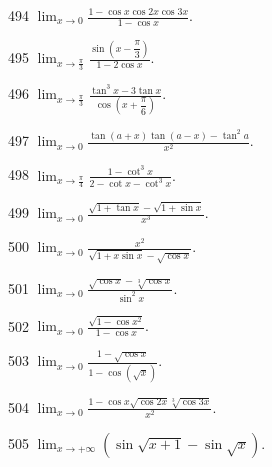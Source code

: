 \begin{prob}[S]{494}
$\displaystyle \lim_{x\to 0} \frac{1 - \cos x \cos 2x \cos 3x}{1 - \cos x}.$
\end{prob}

\begin{prob}[S]{495}
$\displaystyle \lim_{x\to \frac{\pi}{3}} \frac{\sin\left(x - \dfrac{\pi}{3}\right)}{1 - 2\cos x}.$
\end{prob}

\begin{prob}[S]{496}
$\displaystyle \lim_{x\to \frac{\pi}{3}} \frac{\tan^3 x - 3\tan x}{\cos\left(x + \dfrac{\pi}{6}\right)}.$
\end{prob}

\begin{prob}[S]{497}
$\displaystyle \lim_{x\to 0} \frac{\tan(a+x)\tan(a-x) - \tan^2 a}{x^2}.$
\end{prob}

\begin{prob}[S]{498}
$\displaystyle \lim_{x\to \frac{\pi}{4}} \frac{1 - \cot^3 x}{2 - \cot x - \cot^3 x}.$
\end{prob}

\begin{prob}[S]{499}
$\displaystyle \lim_{x\to 0} \frac{\sqrt{1+\tan x} - \sqrt{1+\sin x}}{x^3}.$
\end{prob}

\begin{prob}[S]{500}
$\displaystyle \lim_{x\to 0} \frac{x^2}{\sqrt{1+x\sin x} - \sqrt{\cos x}}.$
\end{prob}

\begin{prob}[S]{501}
$\displaystyle \lim_{x\to 0} \frac{\sqrt{\cos x} - \sqrt[3]{\cos x}}{\sin^2 x}.$
\end{prob}

\begin{prob}[S]{502}
$\displaystyle \lim_{x\to 0} \frac{\sqrt{1-\cos x^2}}{1-\cos x}.$
\end{prob}

\begin{prob}[S]{503}
$\displaystyle \lim_{x\to 0} \frac{1-\sqrt{\cos x}}{1-\cos(\sqrt{x})}.$
\end{prob}

\begin{prob}[S]{504}
$\displaystyle \lim_{x\to 0} \frac{1 - \cos x\sqrt{\cos 2x}\sqrt[3]{\cos 3x}}{x^2}.$
\end{prob}

\begin{prob}[S]{505}
$\displaystyle \lim_{x\to +\infty} (\sin\sqrt{x+1} - \sin\sqrt{x}).$
\end{prob}

